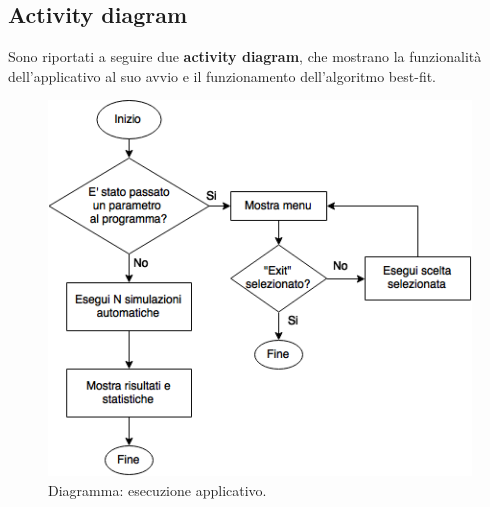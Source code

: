 \documentclass[12pt]{report}
\renewcommand\emph{\textbf}
\begin{document}
        \subsection{Activity diagram}

            Sono riportati a seguire due \emph{activity diagram}, che mostrano la funzionalità dell'applicativo al suo avvio e il funzionamento dell'algoritmo best-fit.

            \begin{figure}[H]
                \caption{Diagramma: esecuzione applicativo.}
                \centering
                \includegraphics[width=1\textwidth]{dia0}
            \end{figure}
\end{document}
